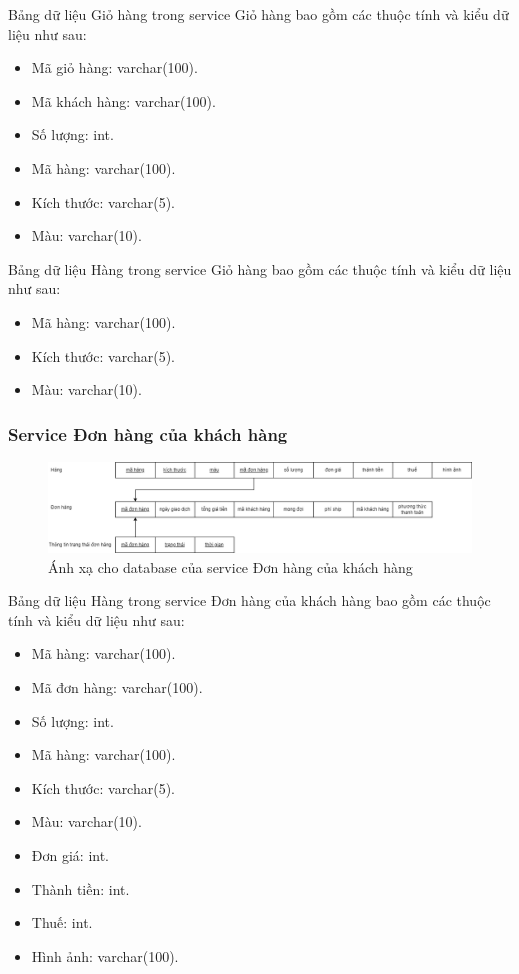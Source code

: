 Bảng dữ liệu Giỏ hàng trong service Giỏ hàng bao gồm các thuộc tính và kiểu dữ liệu như sau:
\begin{itemize}
	\item Mã giỏ hàng: varchar(100).
	\item Mã khách hàng: varchar(100).
	\item Số lượng: int.
	\item Mã hàng: varchar(100).
	\item Kích thước: varchar(5).
	\item Màu: varchar(10).
\end{itemize}

Bảng dữ liệu Hàng trong service Giỏ hàng bao gồm các thuộc tính và kiểu dữ liệu như sau:
\begin{itemize}
	\item Mã hàng: varchar(100).
	\item Kích thước: varchar(5).
	\item Màu: varchar(10).
\end{itemize}

\subsubsection{Service Đơn hàng của khách hàng}
\begin{figure}[!htp]
	\begin{center}
		\includegraphics[width=1\textwidth]{img/database/mapping/mapping-customer-order.png}
		\newline
		\caption{Ánh xạ cho database của service Đơn hàng của khách hàng}
	\end{center}
\end{figure}

Bảng dữ liệu Hàng trong service Đơn hàng của khách hàng bao gồm các thuộc tính và kiểu dữ liệu như sau:
\begin{itemize}
	\item Mã hàng: varchar(100).
	\item Mã đơn hàng: varchar(100).
	\item Số lượng: int.
	\item Mã hàng: varchar(100).
	\item Kích thước: varchar(5).
	\item Màu: varchar(10).
	\item Đơn giá: int.
	\item Thành tiền: int.
	\item Thuế: int.
	\item Hình ảnh: varchar(100).
\end{itemize}

